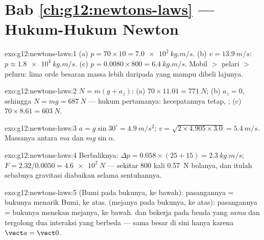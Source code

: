 \section*{Bab \ref{ch:g12:newtons-laws} --- Hukum-Hukum Newton}

\begin{solution}{exo:g12:newtons-laws:1}
(a) $p = 70 \times 10 = \qty{7.0e2}{kg.m/s}$.
(b) $v = \qty{13.9}{m/s}$: $p \approx \qty{1.8e4}{kg.m/s}$.
(c) $p = 0.0080 \times 800 = \qty{6.4}{kg.m/s}$. Mobil $>$ pelari $>$
peluru: lima orde besaran massa lebih daripada yang mampu dibeli lajunya.
\end{solution}

\begin{solution}{exo:g12:newtons-laws:2}
$N = m(g + a_z)$: (a) $70 \times 11.01 = \qty{771}{N}$;
(b) $a_z = 0$, sehingga $N = mg = \qty{687}{N}$ --- hukum pertamanya:
kecepatannya tetap,  ; (c) $70 \times 8.61 = \qty{603}{N}$.
\end{solution}

\begin{solution}{exo:g12:newtons-laws:3}
$a = g\sin 30^\circ = \qty{4.9}{m/s^2}$;
$v = \sqrt{2 \times 4.905 \times 3.0} = \qty{5.4}{m/s}$. Massanya
 antara $ma$ dan $mg\sin\alpha$.
\end{solution}

\begin{solution}{exo:g12:newtons-laws:4}
Berbaliknya: $\Delta p = 0.058 \times (25 + 15) = \qty{2.3}{kg.m/s}$;
$F = 2.32/0.0050 = \qty{4.6e2}{N}$ --- sekitar $800$ kali 
\qty{0.57}{N} bolanya, dan itulah sebabnya gravitasi diabaikan selama sentuhannya.
\end{solution}

\begin{solution}{exo:g12:newtons-laws:5}
 (Bumi pada bukunya, ke bawah): pasangannya = bukunya menarik Bumi, ke atas.
 (mejanya pada bukunya, ke atas): pasangannya = bukunya menekan mejanya,
ke bawah.  dan  bekerja pada benda yang \emph{sama} dan tergolong dua
interaksi yang berbeda --- sama besar di sini hanya karena $\vect a = \vect 0$.
\end{solution}

